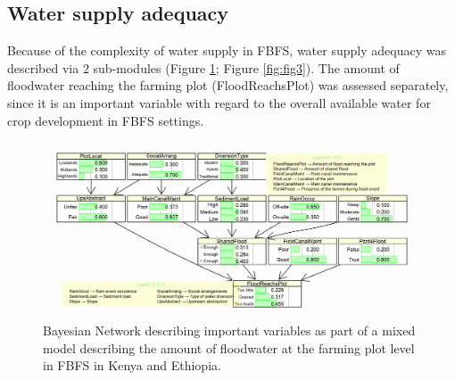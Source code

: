 \documentclass[]{elsarticle} %
\begin{document}
\hypertarget{refs12}{%
\subsection{Water supply adequacy}\label{refs12}}

Because of the complexity of water supply in FBFS, water supply adequacy was described via 2 sub-modules (Figure \ref{fig:fig2}; Figure \ref{fig:fig3}). The amount of floodwater reaching the farming plot (FloodReachsPlot) was assessed separately, since it is an important variable with regard to the overall available water for crop development in FBFS settings.

\begin{figure}[!h]

{\centering \includegraphics[width=1\linewidth,]{figures/figure_s2} 

}

\caption{Bayesian Network describing important variables as part of a mixed model describing the amount of floodwater at the farming plot level in FBFS in Kenya and Ethiopia.}\label{fig:fig2}
\end{figure}
\end{document}
